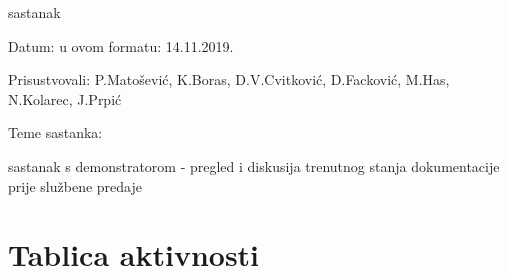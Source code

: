 \begin{packed_enum}
		\item  sastanak
		\item[] \begin{packed_item}
			\item Datum: u ovom formatu: 14.11.2019.
			\item Prisustvovali: P.Matošević, K.Boras, D.V.Cvitković, D.Facković, M.Has, N.Kolarec, J.Prpić
			\item Teme sastanka:
			\begin{packed_item}
				\item  sastanak s demonstratorom - pregled i diskusija trenutnog stanja dokumentacije prije službene predaje
			\end{packed_item}
		\end{packed_item}


%			
%			
			
		\end{packed_enum}
		
		\eject
		\section*{Tablica aktivnosti}
		
%			
%					
						
